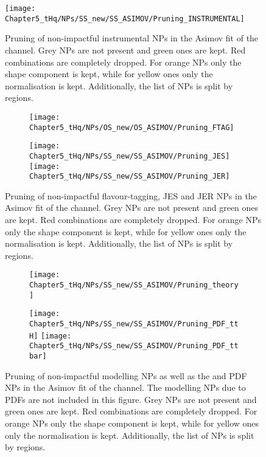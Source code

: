 \begin{figure}[h]
  \centering
  \texttt{[image: Chapter5\_tHq/NPs/SS\_new/SS\_ASIMOV/Pruning\_INSTRUMENTAL]}
   \caption{Pruning of non-impactful instrumental NPs in the Asimov fit of the \dilepSStau channel. Grey NPs are 
   not present and green ones are kept. Red combinations are completely dropped. For orange NPs only the shape 
   component is kept, while for yellow ones only the normalisation is kept. Additionally, the list of NPs is split by regions.}
  \label{fig:Appendix:AdditionalResults:SS:Asimov:Pruning:instrumental_general}
\end{figure}





\begin{figure}[h]
\begin{subfigure}{0.45\textwidth}
  \centering
  \texttt{[image: Chapter5\_tHq/NPs/OS\_new/OS\_ASIMOV/Pruning\_FTAG]}
\end{subfigure}
\hfill 
\begin{subfigure}{0.45\textwidth}
  \texttt{[image: Chapter5\_tHq/NPs/SS\_new/SS\_ASIMOV/Pruning\_JES]}
  \texttt{[image: Chapter5\_tHq/NPs/SS\_new/SS\_ASIMOV/Pruning\_JER]}
\end{subfigure}
   \caption{Pruning of non-impactful flavour-tagging, JES and JER NPs in the Asimov fit of the \dilepSStau channel. Grey NPs are 
   not present and green ones are kept. Red combinations are completely dropped. For orange NPs only the shape 
   component is kept, while for yellow ones only the normalisation is kept. Additionally, the list of NPs is split by regions.}
  \label{fig:Appendix:AdditionalResults:SS:Asimov:Pruning:instrumental_FTAG}
\end{figure}




\begin{figure}[h]
  \centering
  \begin{subfigure}{0.45\textwidth}
      	\texttt{[image: Chapter5\_tHq/NPs/SS\_new/SS\_ASIMOV/Pruning\_theory]}
  \end{subfigure}
  \hfill
  \begin{subfigure}{0.45\textwidth}
 	\texttt{[image: Chapter5\_tHq/NPs/SS\_new/SS\_ASIMOV/Pruning\_PDF\_ttH]}
  	\texttt{[image: Chapter5\_tHq/NPs/SS\_new/SS\_ASIMOV/Pruning\_PDF\_ttbar]}  
  \end{subfigure}
   \caption{Pruning of non-impactful modelling NPs as well as the \ttH and \ttbar PDF NPs in the Asimov fit of the \dilepSStau channel. 
   The modelling NPs due to PDFs are not included in this figure. Grey NPs are 
   not present and green ones are kept. Red combinations are completely dropped. For orange NPs only the shape 
   component is kept, while for yellow ones only the normalisation is kept. Additionally, the list of NPs is split by regions.}
  \label{fig:Appendix:AdditionalResults:SS:Asimov:Pruning:Theory}
\end{figure}


